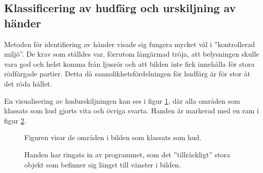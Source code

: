 \documentclass[../rapport_MVEX01-11-05]{subfiles}
\begin{document}
\subsection{Klassificering av hudfärg och urskiljning av händer}

Metoden för identifiering av händer visade sig fungera mycket väl i
''kontrollerad miljö''. De krav som ställdes var, förrutom långärmad
tröja, att belysningen skulle vara god och helst komma från ljusrör
och att bilden inte fick innehålla för stora rödfärgade partier. Detta
då sannolikhetsfördelningen för hudfärg är för stor åt det röda
hållet. 

En visualisering av hudurskiljningen kan ses i figur
\ref{fig:hudklassificering}, där alla områden som klassats som hud
gjorts vita och övriga svarta. Handen är markerad med en ram i figur
\ref{fig:handklassificering}.

\begin{figure}
	  \centering
		\label{fig:hudklassificering}
		\caption{Figuren visar de områden i bilden som
                  klassats som hud.}
\end{figure}

\begin{figure}
	  \centering
		\label{fig:handklassificering}
		\caption{Handen har ringats in av programmet, som det
                  ''tillräckligt'' stora objekt som befinner sig
                  längst till vänster i bilden.}
\end{figure}
\end{document}
